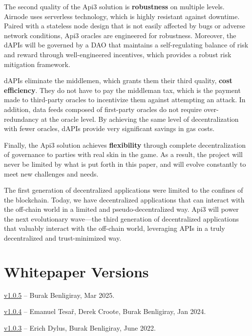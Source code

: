\documentclass[11pt]{article}
\begin{document}
The second quality of the Api3 solution is \textbf{robustness} on multiple levels.
Airnode uses serverless technology, which is highly resistant against downtime.
Paired with a stateless node design that is not easily affected by bugs or adverse network conditions, Api3 oracles are engineered for robustness.
Moreover, the dAPIs will be governed by a DAO that maintains a self-regulating balance of risk and reward through well-engineered incentives, which provides a robust risk mitigation framework.

dAPIs eliminate the middlemen, which grants them their third quality, \textbf{cost efficiency}.
They do not have to pay the middleman tax, which is the payment made to third-party oracles to incentivize them against attempting an attack.
In addition, data feeds composed of first-party oracles do not require over-redundancy at the oracle level.
By achieving the same level of decentralization with fewer oracles, dAPIs provide very significant savings in gas costs.

Finally, the Api3 solution achieves \textbf{flexibility} through complete decentralization of governance to parties with real skin in the game.
As a result, the project will never be limited by what is put forth in this paper, and will evolve constantly to meet new challenges and needs.

The first generation of decentralized applications were limited to the confines of the blockchain.
Today, we have decentralized applications that can interact with the off-chain world in a limited and pseudo-decentralized way.
Api3 will power the next evolutionary wave---the third generation of decentralized applications that valuably interact with the off-chain world, leveraging APIs in a truly decentralized and trust-minimized way.

\small



\newpage
\normalsize
\appendix
\section{Whitepaper Versions}
\label{sec:versions}

\href{https://github.com/api3dao/api3-whitepaper/releases/tag/v1.0.5}{v1.0.5} -- Burak Benligiray, Mar 2025.

\href{https://github.com/api3dao/api3-whitepaper/releases/tag/v1.0.4}{v1.0.4} -- Emanuel Tesař, Derek Croote, Burak Benligiray, Jan 2024.

\href{https://github.com/api3dao/api3-whitepaper/releases/tag/v1.0.3}{v1.0.3} -- Erich Dylus, Burak Benligiray, June 2022.
\end{document}
